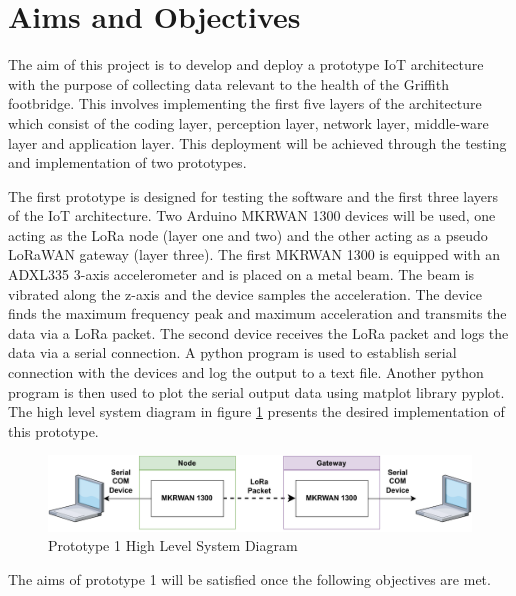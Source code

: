 \section{Aims and Objectives}

The aim of this project is to develop and deploy a prototype IoT architecture with the purpose of collecting data relevant to the health of the Griffith footbridge. This involves implementing the first five layers of the architecture which consist of the coding layer, perception layer, network layer, middle-ware layer and application layer. This deployment will be achieved through the testing and implementation of two prototypes.

The first prototype is designed for testing the software and the first three layers of the IoT architecture. Two Arduino MKRWAN 1300 devices will be used, one acting as the LoRa node (layer one and two) and the other acting as a pseudo LoRaWAN gateway (layer three). The first MKRWAN 1300 is equipped with an ADXL335 3-axis accelerometer and is placed on a metal beam. The beam is vibrated along the z-axis and the device samples the acceleration. The device finds the maximum frequency peak and maximum acceleration and transmits the data via a LoRa packet. The second device receives the LoRa packet and logs the data via a serial connection. A python program is used to establish serial connection with the devices and log the output to a text file. Another python program is then used to plot the serial output data using matplot library pyplot. The high level system diagram in figure \ref{Proto1HLSD} presents the desired implementation of this prototype. 

\begin{figure}[h]
	\centering
	\caption{Prototype 1 High Level System Diagram}
	\label{Proto1HLSD}
	\includegraphics[scale=0.8]{Sections/Introduction/Prototype-1-High-Level.drawio.pdf}
\end{figure}

The aims of prototype 1 will be satisfied once the following objectives are met.

